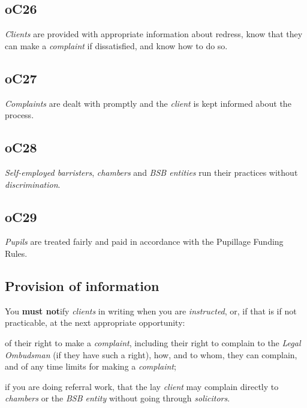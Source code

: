 

\subsection{\color{bleu}oC26}

\emph{Clients} are provided with appropriate information about redress,
know that they can make a \emph{complaint} if dissatisfied, and know how
to do so.~

\subsection{\color{bleu}oC27}

\emph{Complaints} are dealt with promptly and the \emph{client} is kept
informed about the process.

\subsection{\color{bleu}oC28}

\emph{Self-employed barristers}, \emph{chambers} and \emph{BSB entities}
run their practices without \emph{discrimination}.

\subsection{\color{bleu}oC29}

\emph{Pupils} are treated fairly and paid in accordance with the
Pupillage Funding Rules.



\subsection{Provision of information}


You \textcolor{myred}{\textbf{must not}}ify \emph{clients} in writing when you are
\emph{instructed}, or, if that is if not practicable, at the next
appropriate opportunity:
\begin{numlist}\item of their right to make a \emph{complaint}, including their right to
complain to the \emph{Legal Ombudsman} (if they have such a right), how,
and to whom, they can complain, and of any time limits for making a
\emph{complaint};
\item if you are doing referral work, that the lay \emph{client} may
complain directly to \emph{chambers} or the \emph{BSB entity} without
going through \emph{solicitors}.
\end{numlist}

